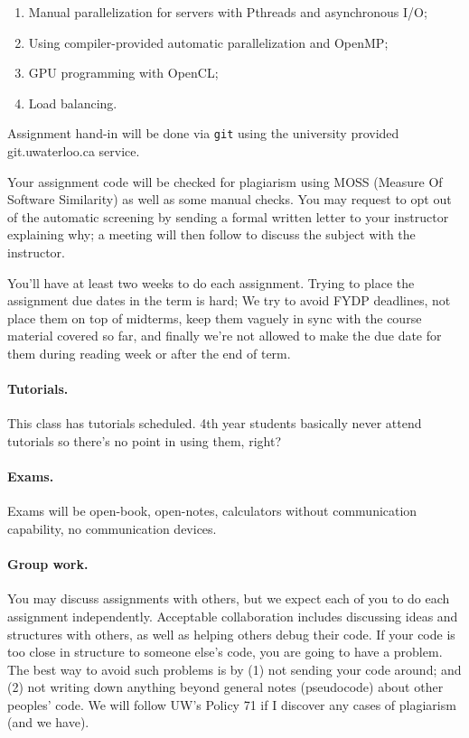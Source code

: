 \documentclass[letterpaper,10pt]{article}
\begin{document}
\begin{enumerate}
\item Manual parallelization for servers with Pthreads and asynchronous I/O;
\item Using compiler-provided automatic parallelization and OpenMP;
\item GPU programming with OpenCL;
\item Load balancing.
\end{enumerate}
Assignment hand-in will be done via \texttt{git} using the university provided git.uwaterloo.ca service.

Your assignment code will be checked for plagiarism using MOSS (Measure Of Software Similarity) as well as some manual checks. You may request to opt out of the automatic screening by sending a formal written letter to your instructor explaining why; a meeting will then follow to discuss the subject with the instructor.

You'll have at least two weeks to do each assignment. Trying to place the assignment due dates in the term is hard; We try to avoid FYDP deadlines, not place them on top of midterms, keep them vaguely in sync with the course material covered so far, and finally we're not allowed to make the due date for them during reading week or after the end of term. 

\paragraph{Tutorials.} This class has tutorials scheduled. 4th year students basically never attend tutorials so there's no point in using them, right?

\paragraph{Exams.} Exams will be open-book, open-notes, calculators without communication capability, no communication devices.

\paragraph{Group work.} 
You may discuss assignments with others, but we expect each of you to
do each assignment independently. Acceptable collaboration includes
discussing ideas and structures with others, as well as helping others
debug their code. If your code is too close in structure to someone
else's code, you are going to have a problem. The best way to avoid
such problems is by (1) not sending your code around; and (2) not
writing down anything beyond general notes (pseudocode) about other
peoples' code. We will follow UW's Policy 71 if I discover any cases of
plagiarism (and we have). 
\end{document}
